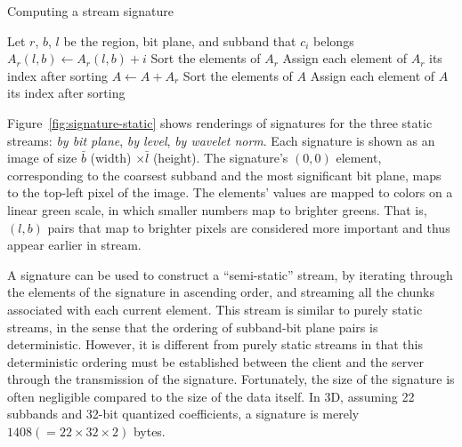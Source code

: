 \begin{algorithm}[h]
  \caption{Computing a stream signature}
  \begin{algorithmic}[1]
			\State Let $r$, $b$, $l$ be the region, bit plane, and subband that $c_i$ belongs
			\State $A_r(l,b) \gets A_r(l,b)+i$
		\EndFor
			\State Sort the elements of $A_r$
			\State Assign each element of $A_r$ its index after sorting
			\State $A \gets A+A_r$
		\EndFor
		\State Sort the elements of $A$
		\State Assign each element of $A$ its index after sorting
	\end{algorithmic}
	\label{alg:signature}
\end{algorithm}

Figure~\ref{fig:signature-static} shows renderings of signatures for the three static streams:
\emph{by bit plane}, \emph{by level}, \emph{by wavelet norm}. Each signature is shown as an image of
size $\bar{b}$ (width) $\times \bar{l}$ (height). The signature's $(0,0)$ element, corresponding to
the coarsest subband and the most significant bit plane, maps to the top-left pixel of the image.
The elements' values are mapped to colors on a linear green scale, in which smaller numbers map to
brighter greens. That is, $(l,b)$ pairs that map to brighter pixels are considered more important
and thus appear earlier in stream.

A signature can be used to construct a ``semi-static'' stream, by iterating through the elements of
the signature in ascending order, and streaming all the chunks associated with each current element.
This stream is similar to purely static streams, in the sense that the ordering of subband-bit plane
pairs is deterministic. However, it is different from purely static streams in that this
deterministic ordering must be established between the client and the server through the
transmission of the signature. Fortunately, the size of the signature is often negligible compared
to the size of the data itself. In 3D, assuming 22 subbands and 32-bit quantized coefficients, a
signature is merely $1408 (=22\times 32\times 2)$ bytes.
